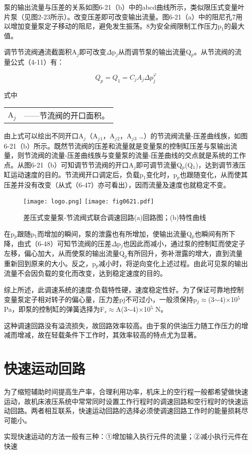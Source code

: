 泵的输出流量与压差的关系如图6-21（b）中的abcd曲线所示，类似限压式变量叶片泵（见图2-23所示）。改变压差即可改变输出流量。图6-21（a）中的阻尼孔7用以增加变量泵定子移动的阻尼，避免发生振荡。8为安全阀限制工作压力p$_1$的最大值。

调节节流阀通流截面积A$_j$即可改变$\Delta$p$_j$从而调节泵的输出流量Q$_p$。从节流阀的流量公式（4-11）有：

\begin{equation}
 Q_p=Q_1=C_jA_j \Delta p_j^\varphi
\end{equation}

\noindent 式中\ 
\begin{tabular} [t]{ll}
A$_j$ &——\hspace{1mm}节流阀的开口面积。
\end{tabular}

由上式可以绘出不同开口A$_j$（A$_j$$_1$，A$_j$$_2$，A$_j$$_3$ …）的节流阀流量-压差曲线族，如图6-21（b）所示。既然节流阀的压差和流量就是变量泵的控制缸压差与泵输出流量，则节流阀的流量-压差曲线族与变量泵的流量-压差曲线的交点就是系统的工作点。从图6-21（b）可知调节节流阀的开口A$_j$即可调节流量Q$_p$(Q$_1$)，达到调节液压缸运动速度的目的。节流阀开口调定后，负载p$_1$变化时，p$_p$也跟随变化，从而使其压差并没有改变（从式（6-47）亦可看出），因而流量及速度也就稳定不变。

\begin{figure}
  \centering
  \ifOpenSource
  \texttt{[image: logo.png]}
  \else
  \texttt{[image: fig0621.pdf]}%
  \fi
  \caption{差压式变量泵-节流阀式联合调速回路(a)回路图；(b)特性曲线}
  \label{fig:fig0621}%
  \end{figure}


在p$_p$跟随p$_1$而增加的瞬间，泵的泄露也有所增加，使输出流量Q$_p$也瞬间有所下降，由式（6-48）可知节流阀的压差$\Delta$p$_j$也因此而减小，通过泵的控制缸而使定子左移，偏心加大，从而使泵的输出流量Q$_p$有所回升，弥补泄露的增大，直到流量重新回到原来的大小。反之，p$_p$减小时，将逆向变化上述过程。由此可见泵的输出流量不会因负载的变化而改变，达到稳定速度的目的。

综上所述，此调速系统的速度-负载特性硬，速度稳定性好。为了保证可靠地控制变量泵定子相对转子的偏心量，压力差pj不可过小，一般须保持p$_j$$\approx$(3$\sim$4)$\times$10$^5$ Pa，即泵的控制缸的弹簧选择为F$_s$$\approx$A(3$\sim$4)$\times$10$^5$ N。

这种调速回路没有溢流损失，故回路效率较高。由于泵的供油压力随工作压力的增减而增减，故在轻载条件下工作时，其效率较高的特点尤为显著。

\section{快速运动回路}
为了缩短辅助时间提高生产率，合理利用功率，机床上的空行程一般都希望做快速运动，故机床液压系统中常常同时设置工作行程时的调速回路和空行程时的快速运动回路。两者相互联系，快速运动回路的选择必须使调速回路工作时的能量损耗尽可能小。

实现快速运动的方法一般有三种：①增加输入执行元件的流量；②减小执行元件在快速
